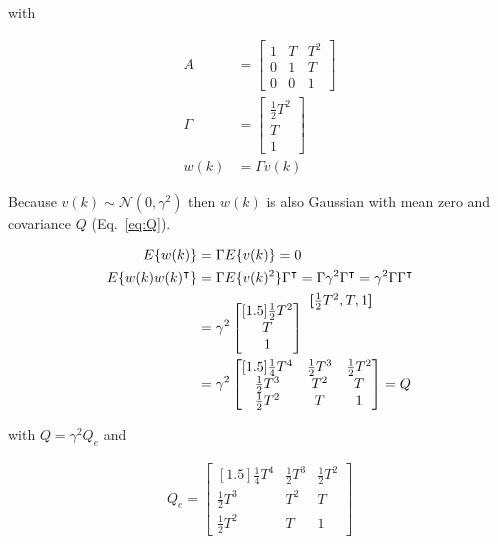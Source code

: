\documentclass[fleqn,12pt]{article}
\newenvironment{rowvector}
 {\bm{[}\begin{matrix}}
 {\end{matrix}\bm{]}}
\begin{document}
\noindent with 

\begin{align}
    A&=\begin{bmatrix}
          1 & T & T^2\\
          0 & 1 & T\\
          0 & 0 & 1
    \end{bmatrix}\\
    \Gamma&=\begin{bmatrix}
               \frac{1}{2}T^2\\
               T\\
               1
            \end{bmatrix}\nonumber\\
    w(k)&=\Gamma v(k)\nonumber
\end{align}

Because $v(k)\sim\mathcal{N}(0,\gamma^2)$ then $w(k)$ is also Gaussian with
mean zero and covariance $Q$ (Eq.~\ref{eq:Q}).

\begin{align}
    E\{w(k)\}&=\Gamma E\{v(k)\}=0\nonumber{}\\
    E\{w(k)w(k)^\intercal\}&=\Gamma E\{v(k)^2\}\Gamma^\intercal=\Gamma\gamma^2\Gamma^\intercal=\gamma^2\Gamma\Gamma^\intercal\nonumber\\
     &=\gamma^2\begin{bmatrix}[1.5]
         \frac{1}{2}T^2\\
         T\\
         1
       \end{bmatrix}
     \raisebox{4.5ex}{
         $\begin{rowvector}\frac{1}{2}T^2, T, 1\end{rowvector}$
     }\nonumber\\
     &=\gamma^2\begin{bmatrix}[1.5]
                   \frac{1}{4}T^4&\frac{1}{2}T^3&\frac{1}{2}T^2\\
                   \frac{1}{2}T^3&T^2&T\\
                   \frac{1}{2}T^2&T&1
     \end{bmatrix}=Q
\end{align}

\noindent with $Q=\gamma^2Q_e$ and

\begin{align}
    Q_e=\begin{bmatrix}[1.5]
             \frac{1}{4}T^4&\frac{1}{2}T^3&\frac{1}{2}T^2\\
             \frac{1}{2}T^3&T^2&T\\
             \frac{1}{2}T^2&T&1
        \end{bmatrix}\label{eq:Qe}
\end{align}
\end{document}
